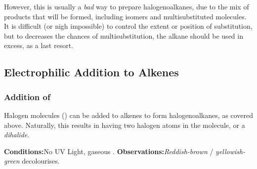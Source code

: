 
			However, this is usually a \textit{bad} way to prepare halogenoalkanes, due to the mix of products that will be formed, including
			isomers and multisubstituted molecules. It is difficult (or nigh impossible) to control the extent or position of substitution,
			but to decreases the chances of multisubstitution, the alkane should be used in excess, as a last resort.



		\pagebreak
		\subsection{Electrophilic Addition to Alkenes}

			\subsubsection{Addition of }

				Halogen molecules () can be added to alkenes to form halogenoalkanes, as covered above. Naturally, this results in
				having two halogen atoms in the molecule, or a \textit{dihalide}.

				\vspace{1.5em}
				\vbox{\textbf{Conditions:}\tabto{35mm}No UV Light, gaseous .}	%
				\vbox{\textbf{Observations:}\tabto{35mm}\textit{\color{Mahogany}Reddish-brown}  / \textit{\color{YellowGreen}yellowish-green}  decolourises.}


